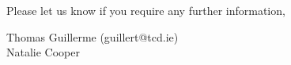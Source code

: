 \documentclass[12pt,letterpaper]{article}
\begin{document}
\begin{enumerate}


\end{enumerate}

Please let us know if you require any further information,\\
\bigskip

Thomas Guillerme (guillert@tcd.ie)\\
Natalie Cooper
\end{document}
